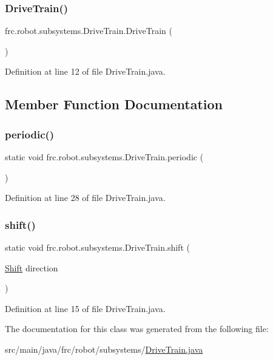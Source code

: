 \subsubsection{\texorpdfstring{Drive\+Train()}{DriveTrain()}}
{\footnotesize\ttfamily frc.\+robot.\+subsystems.\+Drive\+Train.\+Drive\+Train (\begin{DoxyParamCaption}{ }\end{DoxyParamCaption})}



Definition at line 12 of file Drive\+Train.\+java.



\subsection{Member Function Documentation}
\mbox{\label{classfrc_1_1robot_1_1subsystems_1_1DriveTrain_a883baac3715e22887c0ec5ce825fbfab}} 
\subsubsection{\texorpdfstring{periodic()}{periodic()}}
{\footnotesize\ttfamily static void frc.\+robot.\+subsystems.\+Drive\+Train.\+periodic (\begin{DoxyParamCaption}{ }\end{DoxyParamCaption})\hspace{0.3cm}{\ttfamily [static]}}



Definition at line 28 of file Drive\+Train.\+java.

\mbox{\label{classfrc_1_1robot_1_1subsystems_1_1DriveTrain_a3288b5af8182d08f76290b257041538c}} 
\subsubsection{\texorpdfstring{shift()}{shift()}}
{\footnotesize\ttfamily static void frc.\+robot.\+subsystems.\+Drive\+Train.\+shift (\begin{DoxyParamCaption}\item[{\hyperlink{enumfrc_1_1robot_1_1Enums_1_1Shift}{Shift}}]{direction }\end{DoxyParamCaption})\hspace{0.3cm}{\ttfamily [static]}}



Definition at line 15 of file Drive\+Train.\+java.



The documentation for this class was generated from the following file\+:\begin{DoxyCompactItemize}
\item 
src/main/java/frc/robot/subsystems/\hyperlink{DriveTrain_8java}{Drive\+Train.\+java}\end{DoxyCompactItemize}
